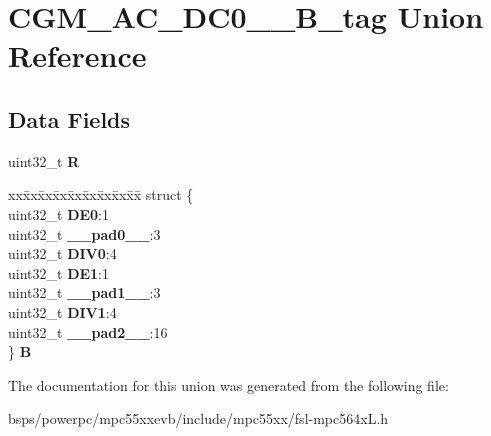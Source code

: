 \hypertarget{unionCGM__AC__DC0__3__32B__tag}{}\section{C\+G\+M\+\_\+\+A\+C\+\_\+\+D\+C0\+\_\+\_\+B\+\_\+tag Union Reference}
\label{unionCGM__AC__DC0__3__32B__tag}
\subsection*{Data Fields}
\begin{DoxyCompactItemize}
\item 
\mbox{\label{unionCGM__AC__DC0__3__32B__tag_a93167d6457844475c7ca4186997c7cdf}} 
uint32\+\_\+t {\bfseries R}
\item 
\mbox{\label{unionCGM__AC__DC0__3__32B__tag_a5027d2e084670d605a0f7eeec8a5b627}} 
\begin{tabbing}
xx\=xx\=xx\=xx\=xx\=xx\=xx\=xx\=xx\=\kill
struct \{\\
\>uint32\_t {\bfseries DE0}:1\\
\>uint32\_t {\bfseries \_\_pad0\_\_}:3\\
\>uint32\_t {\bfseries DIV0}:4\\
\>uint32\_t {\bfseries DE1}:1\\
\>uint32\_t {\bfseries \_\_pad1\_\_}:3\\
\>uint32\_t {\bfseries DIV1}:4\\
\>uint32\_t {\bfseries \_\_pad2\_\_}:16\\
\} {\bfseries B}\\

\end{tabbing}\end{DoxyCompactItemize}


The documentation for this union was generated from the following file\+:\begin{DoxyCompactItemize}
\item 
bsps/powerpc/mpc55xxevb/include/mpc55xx/fsl-\/mpc564x\+L.\+h\end{DoxyCompactItemize}
